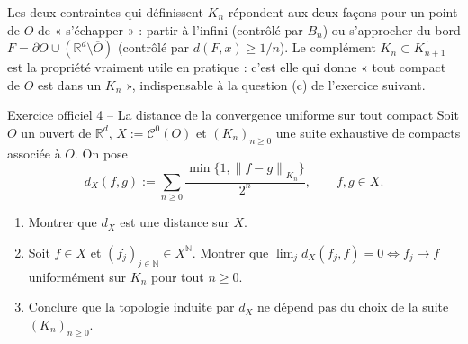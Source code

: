 \documentclass[11pt,a4paper]{article}
\newcommand{\R}{\mathbb{R}}
\newcommand{\N}{\mathbb{N}}
\newcommand{\interieur}[1]{\mathring{#1}}
\newcommand{\adh}[1]{\overline{#1}}
\newcommand{\norm}[1]{\left\|#1\right\|}
\newcommand{\Cz}{\mathcal{C}^0}
\theoremstyle{definition}
\begin{document}
\begin{pointcle}
Les deux contraintes qui définissent $K_n$ répondent aux deux façons pour un point de $O$ de « s'échapper » : partir à l'infini (contrôlé par $B_n$) ou s'approcher du bord $F=\partial O\cup(\R^d\setminus\adh O)$ (contrôlé par $d(F,x)\ge1/n$). Le complément $K_n\subset\interieur{K_{n+1}}$ est la propriété vraiment utile en pratique : c'est elle qui donne « tout compact de $O$ est dans un $K_n$ », indispensable à la question (c) de l'exercice suivant.
\end{pointcle}

\begin{exo}{Exercice officiel 4 -- La distance de la convergence uniforme sur tout compact}
Soit $O$ un ouvert de $\R^d$, $X:=\Cz(O)$ et $(K_n)_{n\ge0}$ une suite exhaustive de compacts associée à $O$. On pose
\[
d_X(f,g):=\sum_{n\ge0}\frac{\min\{1,\norm{f-g}_{K_n}\}}{2^n},\qquad f,g\in X .
\]
\begin{enumerate}[label=(\alph*)]
  \item Montrer que $d_X$ est une distance sur $X$.
  \item Soit $f\in X$ et $(f_j)_{j\in\N}\in X^\N$. Montrer que $\lim_jd_X(f_j,f)=0\iff f_j\to f$ uniformément sur $K_n$ pour tout $n\ge0$.
  \item Conclure que la topologie induite par $d_X$ ne dépend pas du choix de la suite $(K_n)_{n\ge0}$.
\end{enumerate}
\end{exo}
\end{document}

